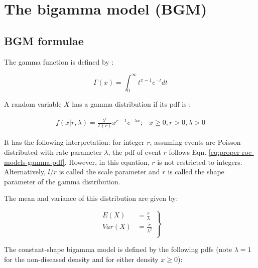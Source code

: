 \documentclass[
]{book}
\begin{document}
\hypertarget{proper-roc-models-bigamma}{%
\section{The bigamma model (BGM)}\label{proper-roc-models-bigamma}}

\hypertarget{proper-roc-models-bigamma-formulae}{%
\subsection{BGM formulae}\label{proper-roc-models-bigamma-formulae}}

The gamma function is defined by \citep{abramowitz1964handbook}:

\begin{equation}
\Gamma\left( x \right) = \int_{0}^{\infty}t^{x-1}e^{-t} dt
\label{eq:proper-roc-models-gamma}
\end{equation}

A random variable \(X\) has a gamma distribution if its \(\text{pdf}\) is \citep{larsen2005introduction}:

\begin{equation}
\begin{matrix}
f\left( x |r,\lambda\right) = \frac{\lambda^r}{\Gamma\left( r \right)}x^{r-1}e^{-\lambda x}; & 
x\ge 0, r>0, \lambda >0
\end{matrix}
\label{eq:proper-roc-models-gamma-pdf}
\end{equation}

It has the following interpretation: for integer \(r\), assuming events are Poisson distributed with rate parameter \(\lambda\), the \(\text{pdf}\) of event \(r\) follows Eqn. \eqref{eq:proper-roc-models-gamma-pdf}. However, in this equation, \(r\) is not restricted to integers. Alternatively, \(l/r\) is called the scale parameter and \(r\) is called the shape parameter of the gamma distribution.

The mean and variance of this distribution are given by:

\begin{equation}
\left.\begin{aligned}
E\left( X \right) &= \frac{r}{\lambda} \\
Var\left( X \right) &= \frac{r}{\lambda^2} \\
\end{aligned}\right\}
\label{eq:proper-roc-models-gamma-mean-var}
\end{equation}

The constant-shape bigamma model is defined \citep{dorfman1997proper} by the following pdfs (note \(\lambda = 1\) for the non-diseased density and for either density \(x \ge 0\)):
\end{document}
